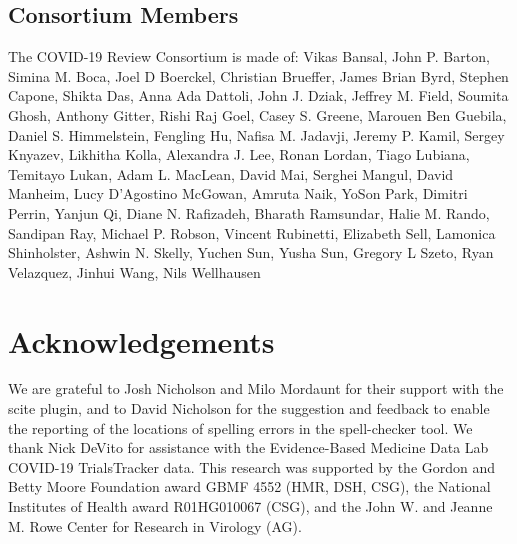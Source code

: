 \documentclass[sigconf]{acmart}
\begin{document}
\hypertarget{consortium-members}{%
\subsection*{Consortium Members}\label{consortium-members}}

The COVID-19 Review Consortium is made of:
Vikas Bansal, John P. Barton, Simina M. Boca, Joel D Boerckel, Christian Brueffer, James Brian Byrd, Stephen Capone, Shikta Das, Anna Ada Dattoli, John J. Dziak, Jeffrey M. Field, Soumita Ghosh, Anthony Gitter, Rishi Raj Goel, Casey S. Greene, Marouen Ben Guebila, Daniel S. Himmelstein, Fengling Hu, Nafisa M. Jadavji, Jeremy P. Kamil, Sergey Knyazev, Likhitha Kolla, Alexandra J. Lee, Ronan Lordan, Tiago Lubiana, Temitayo Lukan, Adam L. MacLean, David Mai, Serghei Mangul, David Manheim, Lucy D'Agostino McGowan, Amruta Naik, YoSon Park, Dimitri Perrin, Yanjun Qi, Diane N. Rafizadeh, Bharath Ramsundar, Halie M. Rando, Sandipan Ray, Michael P. Robson, Vincent Rubinetti, Elizabeth Sell, Lamonica Shinholster, Ashwin N. Skelly, Yuchen Sun, Yusha Sun, Gregory L Szeto, Ryan Velazquez, Jinhui Wang, Nils Wellhausen

\hypertarget{acknowledgements}{%
\section*{Acknowledgements}\label{acknowledgements}}

We are grateful to Josh Nicholson and Milo Mordaunt for their support with the scite plugin, and to David Nicholson for the suggestion and feedback to enable the reporting of the locations of spelling errors in the spell-checker tool.
We thank Nick DeVito for assistance with the Evidence-Based Medicine Data Lab COVID-19 TrialsTracker data.
This research was supported by the Gordon and Betty Moore Foundation award GBMF 4552 (HMR, DSH, CSG), the National Institutes of Health award R01HG010067 (CSG), and the John W. and Jeanne M. Rowe Center for Research in Virology (AG).


	\balance
	
\end{document}
